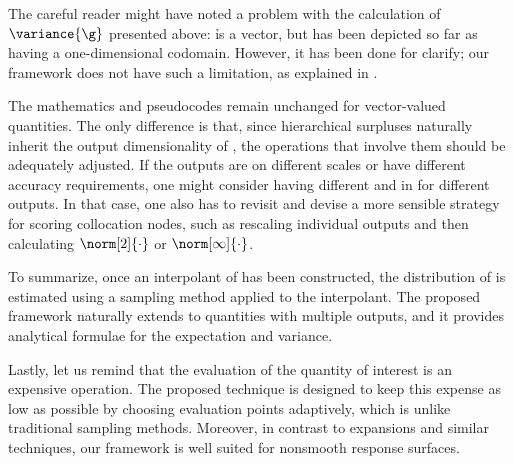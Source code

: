 The careful reader might have noted a problem with the calculation of
$\variance{\g}$ presented above: \h is a vector, but \g has been depicted so far
as having a one-dimensional codomain. However, it has been done for clarify; our
framework does not have such a limitation, as explained in
.

\begin{remark} 
The mathematics and pseudocodes remain unchanged for vector-valued quantities.
The only difference is that, since hierarchical surpluses naturally inherit the
output dimensionality of \g, the operations that involve them should be
adequately adjusted. If the outputs are on different scales or have different
accuracy requirements, one might consider having different  and
 in  for different outputs. In that case, one also has
to revisit  and devise a more sensible strategy for scoring
collocation nodes, such as rescaling individual outputs and then calculating
$\norm[2]{\cdot}$ or $\norm[\infty]{\cdot}$.
\end{remark}

To summarize, once an interpolant of \g has been constructed, the distribution
of \g is estimated using a sampling method applied to the interpolant. The
proposed framework naturally extends to quantities with multiple outputs, and it
provides analytical formulae for the expectation and variance.

Lastly, let us remind that the evaluation of the quantity of interest is an
expensive operation. The proposed technique is designed to keep this expense as
low as possible by choosing evaluation points adaptively, which is unlike
traditional sampling methods. Moreover, in contrast to  expansions and
similar techniques, our framework is well suited for nonsmooth response
surfaces.
